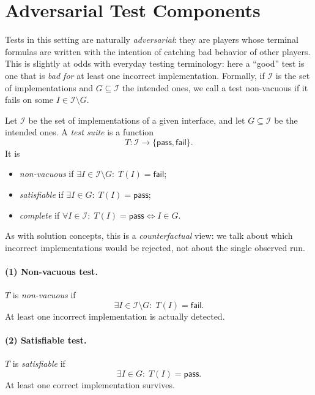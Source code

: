 
\section{Adversarial Test Components}
\label{sec:tests-adversarial}

Tests in this setting are naturally \emph{adversarial}: they are players whose
terminal formulas are written with the intention of catching bad behavior of
other players. This is slightly at odds with everyday testing terminology: here
a ``good'' test is one that is \emph{bad for} at least one incorrect
implementation. Formally, if $\mathcal I$ is the set of implementations and
$G \subseteq \mathcal I$ the intended ones, we call a test non-vacuous if it
fails on some $I \in \mathcal I \setminus G$.

\begin{definition}
Let $\mathcal I$ be the set of implementations of a given interface, and let
$G \subseteq \mathcal I$ be the intended ones. A \emph{test suite} is a function
\[
  T : \mathcal I \to \{\mathsf{pass}, \mathsf{fail}\}.
\]
It is
\begin{itemize}
  \item \emph{non-vacuous} if $\exists I \in \mathcal I \setminus G:\; T(I) =
    \mathsf{fail}$;
  \item \emph{satisfiable} if $\exists I \in G:\; T(I) = \mathsf{pass}$;
  \item \emph{complete} if $\forall I \in \mathcal I:\; T(I) = \mathsf{pass}
    \iff I \in G$.
\end{itemize}
\end{definition}

As with solution concepts, this is a \emph{counterfactual} view: we talk about
which incorrect implementations would be rejected, not about the single
observed run.

\paragraph{(1) Non-vacuous test.}
$T$ is \emph{non-vacuous} if
\[
  \exists I \in \mathcal I \setminus G:\; T(I) = \mathsf{fail}.
\]
At least one incorrect implementation is actually detected.

\paragraph{(2) Satisfiable test.}
$T$ is \emph{satisfiable} if
\[
  \exists I \in G:\; T(I) = \mathsf{pass}.
\]
At least one correct implementation survives.

